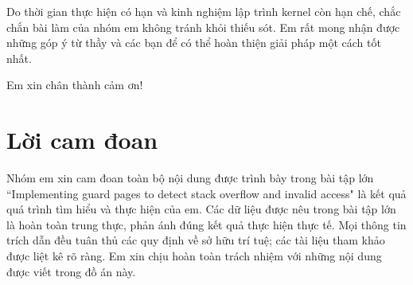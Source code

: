 Do thời gian thực hiện có hạn và kinh nghiệm lập trình kernel còn hạn chế, chắc chắn bài làm của nhóm em không tránh khỏi thiếu sót. Em rất mong nhận được những góp ý từ thầy và các bạn để có thể hoàn thiện giải pháp một cách tốt nhất.

Em xin chân thành cảm ơn!

\newpage

\chapter*{Lời cam đoan}


Nhóm em xin cam đoan toàn bộ nội dung được trình bày trong bài tập lớn “Implementing guard pages to detect stack overflow and invalid access" là kết quả quá trình tìm hiểu và thực hiện của em. Các dữ liệu được nêu trong bài tập lớn là hoàn toàn trung thực, phản ánh đúng kết quả thực hiện thực tế. Mọi thông tin trích dẫn đều tuân thủ các quy định về sở hữu trí tuệ; các tài liệu tham khảo được liệt kê rõ ràng. Em xin chịu hoàn toàn trách nhiệm với những nội dung được viết trong đồ án này.

